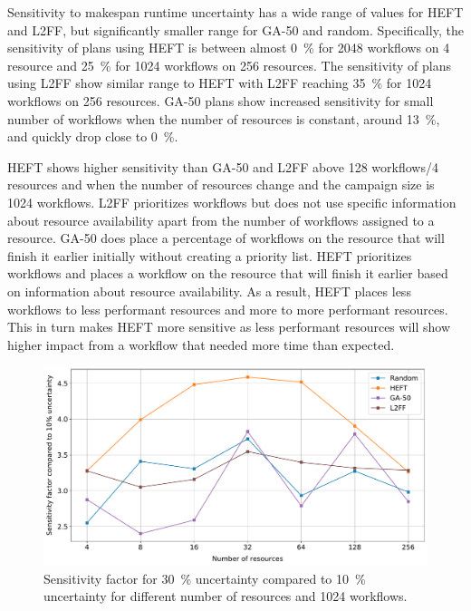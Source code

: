 Sensitivity to makespan runtime uncertainty has a wide range of values for HEFT and L2FF, but significantly smaller range for GA-50 and random.
Specifically, the sensitivity of plans using HEFT is between almost 0~\% for 2048 workflows on 4 resource and 25~\% for 1024 workflows on 256 resources.
The sensitivity of plans using L2FF show similar range to HEFT with L2FF reaching 35~\% for 1024 workflows on 256 resources.
GA-50 plans show increased sensitivity for small number of workflows when the number of resources is constant, around 13~\%, and quickly drop close to 0~\%.

HEFT shows higher sensitivity than GA-50 and L2FF above 128 workflows/4 resources and when the number of resources change and the campaign size is 1024 workflows.
L2FF prioritizes workflows but does not use specific information about resource availability apart from the number of workflows assigned to a resource.
GA-50 does place a percentage of workflows on the resource that will finish it earlier initially without creating a priority list.
HEFT prioritizes workflows and places a workflow on the resource that will finish it earlier based on information about resource availability.
As a result, HEFT places less workflows to less performant resources and more to more performant resources.
This in turn makes HEFT more sensitive as less performant resources will show higher impact from a workflow that needed more time than expected.

\begin{figure}[ht!]
    \centering
    \includegraphics[width=.95\textwidth]{figures/campaign/InaccurStHeteroResources_StHeteroCampaignsSensFactor.pdf}
    \caption{Sensitivity factor for 30~\% uncertainty compared to 10~\% uncertainty for different number of resources and 1024 workflows.}
    \label{fig:InaccurStHeteroResources_StHeteroCampaignsSensFactor}
\end{figure}

